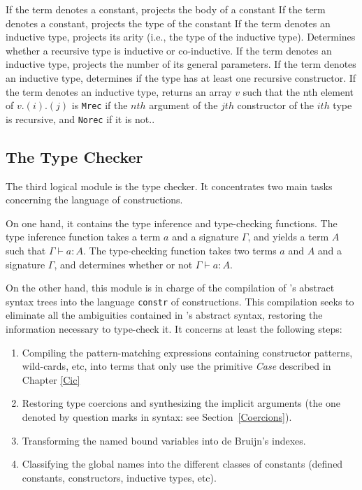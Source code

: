 \begin{description}
    {If the term denotes a constant, projects the body of a constant}
    {If the term denotes a constant, projects the type of the constant}
    {If the term denotes an inductive type, projects its arity (i.e.,
     the type of the inductive type).}
    {Determines whether a recursive type is inductive or co-inductive.}
    {If the term denotes an inductive type, projects the number of 
     its general parameters.}
    {If the term denotes an inductive type, 
     determines if the type has at least one recursive constructor. }
    {If the term denotes an inductive type, returns an array $v$ such 
     that the nth element of $v.(i).(j)$ is
    \texttt{Mrec} if the $nth$ argument of the $jth$ constructor of
    the $ith$ type is recursive, and \texttt{Norec} if it is not.}.
\end{description}

\subsection[The Type Checker]{The Type Checker\label{TypeChecker}}

The third logical module is the type checker. It concentrates two main
tasks concerning the language of constructions.

On one hand, it contains the type inference and type-checking
functions.  The type inference function takes a term
$a$ and a signature $\Gamma$, and yields a term $A$ such that
$\Gamma \vdash a:A$.  The type-checking function takes two terms $a$
and $A$ and a signature $\Gamma$, and determines whether or not
$\Gamma \vdash a:A$.

On the other hand, this module is in charge of the compilation of
\Coq's abstract syntax trees into the language \texttt{constr} of
constructions. This compilation seeks to eliminate all the ambiguities
contained in \Coq's abstract syntax, restoring the information
necessary to type-check it.  It concerns at least the following steps:
\begin{enumerate}
\item Compiling the pattern-matching expressions containing 
constructor patterns, wild-cards, etc, into terms that only
use the primitive \textsl{Case} described in Chapter \ref{Cic}
\item Restoring type coercions and synthesizing the implicit arguments
(the one denoted by question marks in
{\Coq} syntax: see Section~\ref{Coercions}).
\item Transforming the named bound variables into de Bruijn's indexes.
\item Classifying the global names into the different classes of
constants (defined constants, constructors, inductive types, etc).
\end{enumerate}

